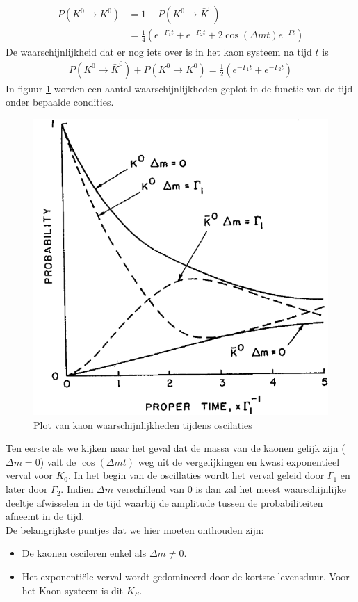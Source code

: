\documentclass[../main.tex]{subfiles}
\begin{document}
\begin{equation}
    \begin{aligned}
        \label{eq:voorbeeld_kaon_osc_tijd_prop_4}
        P\left(K^{0} \rightarrow K^{0}\right) &= 1-P\left(K^{0} \rightarrow \bar{K}^{0}\right)\\
                                              &=\frac{1}{4}\left(e^{-\Gamma_{1} t}+e^{-\Gamma_{2} t}+2 \cos (\Delta m t) e^{-\Gamma t}\right)
    \end{aligned}
\end{equation}
De waarschijnlijkheid dat er nog iets over is in het kaon systeem na tijd $t$ is
\begin{equation}
    \begin{aligned}
        \label{eq:voorbeeld_kaon_osc_tijd_prop_5}
        P\left(K^{0} \rightarrow \bar{K}^{0}\right)+P\left(K^{0} \rightarrow K^{0}\right)=\frac{1}{2}\left(e^{-\Gamma_{1} t}+e^{-\Gamma_{2} t}\right)
    \end{aligned}
\end{equation}
In figuur \ref{fig:meson_mixing_and_oscillations/kaon_osc_tijd_plot} worden een aantal waarschijnlijkheden geplot in de functie van de tijd onder bepaalde condities.

\begin{figure}[h]
    \centering
    \includegraphics[width=0.5\linewidth]{meson_mixing_and_oscillations/kaon_osc_tijd_plot.png}
    \caption{Plot van kaon waarschijnlijkheden tijdens oscilaties}%
    \label{fig:meson_mixing_and_oscillations/kaon_osc_tijd_plot}
\end{figure}

Ten eerste als we kijken naar het geval dat de massa van de kaonen gelijk zijn ($\Delta m = 0$) valt de $\cos(\Delta m t)$ weg uit de vergelijkingen en kwasi exponentieel verval voor $K_0$. In het begin van de oscillaties wordt het verval geleid door $\Gamma_1$ en later door $\Gamma_2$. Indien $\Delta m$ verschillend van 0 is dan zal het meest waarschijnlijke deeltje afwisselen in de tijd waarbij de amplitude tussen de probabiliteiten afneemt in de tijd.\\
De belangrijkste puntjes dat we hier moeten onthouden zijn:
\begin{itemize}
    \item De kaonen oscileren enkel als $\Delta m \neq 0$.
    \item Het exponentiële verval wordt gedomineerd door de kortste levensduur. Voor het Kaon systeem is dit $K_S$.
\end{itemize}
\end{document}
